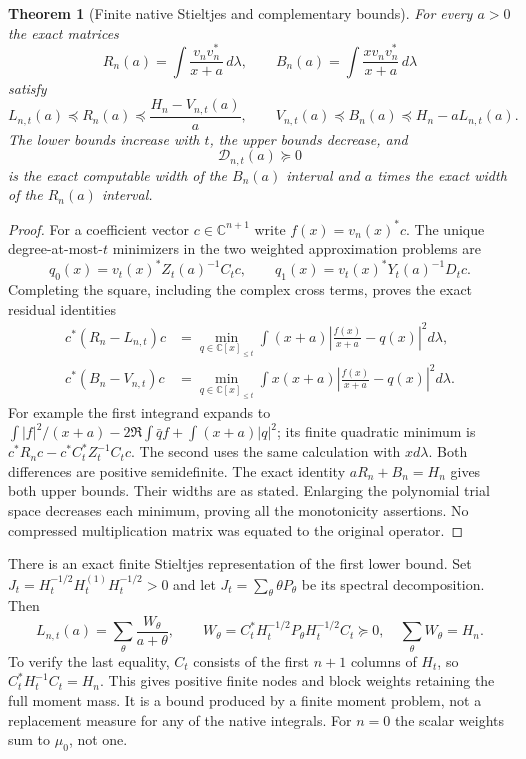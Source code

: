 \documentclass[11pt]{article}
\newtheorem{theorem}{Theorem}
\newcommand{\C}{\mathbb C}
\begin{document}
\begin{theorem}[Finite native Stieltjes and complementary bounds]
\label{thm:finite}
For every $a>0$ the exact matrices
\[
 R_n(a)=\int\frac{v_nv_n^*}{x+a}\,d\lambda,
 \qquad B_n(a)=\int\frac{xv_nv_n^*}{x+a}\,d\lambda
\]
satisfy
\begin{equation}\label{eq:bounds}
 \boxed{L_{n,t}(a)\preceq R_n(a)
       \preceq\frac{H_n-V_{n,t}(a)}a,\qquad
 V_{n,t}(a)\preceq B_n(a)\preceq H_n-aL_{n,t}(a).}
\end{equation}
The lower bounds increase with $t$, the upper bounds decrease, and
\begin{equation}\label{eq:gap}
 \mathcal D_{n,t}(a)\succeq0
\end{equation}
is the exact computable width of the $B_n(a)$ interval and $a$ times
the exact width of the $R_n(a)$ interval.
\end{theorem}
\begin{proof}
For a coefficient vector $c\in\C^{n+1}$ write
$f(x)=v_n(x)^*c$.  The unique degree-at-most-$t$ minimizers in the
two weighted approximation problems are
\[
 q_0(x)=v_t(x)^*Z_t(a)^{-1}C_tc,
 \qquad q_1(x)=v_t(x)^*Y_t(a)^{-1}D_tc.
\]
Completing the square, including the complex cross terms, proves
the exact residual identities
\begin{align}
 c^*(R_n-L_{n,t})c
 &=\min_{q\in\C[x]_{\le t}}
   \int(x+a)\left|\frac{f(x)}{x+a}-q(x)\right|^2d\lambda,
 \label{eq:residual0}\\
 c^*(B_n-V_{n,t})c
 &=\min_{q\in\C[x]_{\le t}}
   \int x(x+a)\left|\frac{f(x)}{x+a}-q(x)\right|^2d\lambda.
 \label{eq:residual1}
\end{align}
For example the first integrand expands to
$\int|f|^2/(x+a)-2\Re\int\bar qf+\int(x+a)|q|^2$;
its finite quadratic minimum is $c^*R_nc-c^*C_t^*Z_t^{-1}C_tc$.
The second uses the same calculation with $xd\lambda$.
Both differences are positive semidefinite.  The exact identity
$aR_n+B_n=H_n$ gives both upper bounds.  Their widths are as stated.
Enlarging the polynomial trial space decreases each minimum, proving
all the monotonicity assertions.  No compressed multiplication matrix
was equated to the original operator.
\end{proof}

There is an exact finite Stieltjes representation of the first lower
bound.  Set $J_t=H_t^{-1/2}H_t^{(1)}H_t^{-1/2}>0$ and let
$J_t=\sum_\theta\theta P_\theta$ be its spectral decomposition.  Then
\begin{equation}\label{eq:blockstieltjes}
 L_{n,t}(a)=\sum_\theta\frac{W_\theta}{a+\theta},\qquad
 W_\theta=C_t^*H_t^{-1/2}P_\theta H_t^{-1/2}C_t\succeq0,
 \quad\sum_\theta W_\theta=H_n.
\end{equation}
To verify the last equality, $C_t$ consists of the first $n+1$
columns of $H_t$, so $C_t^*H_t^{-1}C_t=H_n$.  This gives positive
finite nodes and block weights retaining the full moment mass.  It is
a bound produced by a finite moment problem, not a replacement measure
for any of the native integrals.  For $n=0$ the scalar weights sum to
$\mu_0$, not one.
\end{document}
